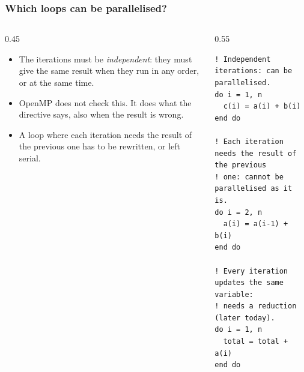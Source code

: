 \begin{frame}[fragile]
  \frametitle{Which loops can be parallelised?}
  \begin{columns}[T]
    \begin{column}{0.45\textwidth}
      \begin{itemize}
        \item The iterations must be \emph{independent}: they must give the same result when they run in any order, or at the same time.
        \item OpenMP does not check this. It does what the directive says, also when the result is wrong.
        \item A loop where each iteration needs the result of the previous one has to be rewritten, or left serial.
      \end{itemize}
    \end{column}

    \begin{column}{0.55\textwidth}
      \begin{lstlisting}
! Independent iterations: can be parallelised.
do i = 1, n
  c(i) = a(i) + b(i)
end do

! Each iteration needs the result of the previous
! one: cannot be parallelised as it is.
do i = 2, n
  a(i) = a(i-1) + b(i)
end do

! Every iteration updates the same variable:
! needs a reduction (later today).
do i = 1, n
  total = total + a(i)
end do
      \end{lstlisting}
    \end{column}
  \end{columns}
\end{frame}


